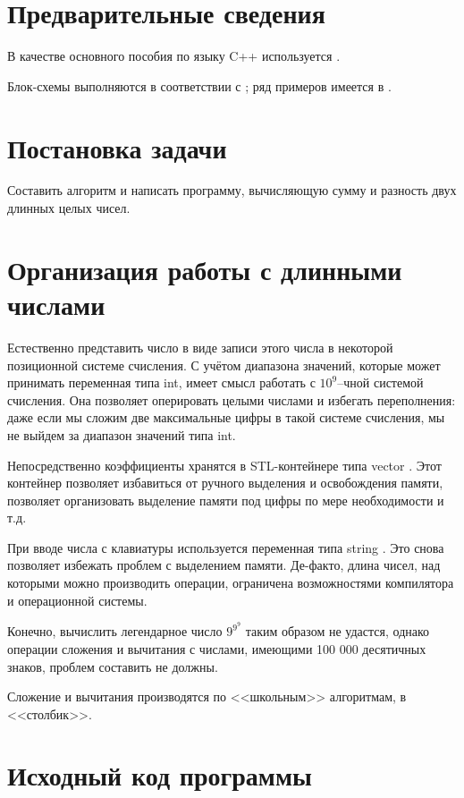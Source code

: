\documentclass[a4paper,12pt]{article} %
\begin{document}
\setcounter{page}{2}

\section*{Предварительные сведения}

В качестве основного пособия по языку C++ используется \cite{chmyhalo}.


Блок-схемы выполняются в соответствии с \cite{gost-block-scheme};
ряд примеров имеется в \cite{wiki-block-scheme}.


\section*{Постановка задачи}
Составить алгоритм и написать программу,
вычисляющую сумму и разность двух длинных целых чисел.

\section*{Организация работы с длинными числами}

Естественно представить число в виде записи этого числа в некоторой позиционной системе счисления.
С учётом диапазона значений, которые может принимать переменная типа int, имеет смысл работать с $10^9$--чной системой счисления.
Она позволяет оперировать целыми числами и избегать переполнения:
даже если мы сложим две максимальные цифры в такой системе счисления, мы не выйдем за диапазон значений типа int.

Непосредственно коэффициенты хранятся в STL-контейнере типа vector \cite{vector-cplusplus}.
Этот контейнер позволяет избавиться от ручного выделения и освобождения памяти,
позволяет организовать выделение памяти под цифры по мере необходимости и т.д.

При вводе числа с клавиатуры используется переменная типа string \cite{string-cplusplus}.
Это снова позволяет избежать проблем с выделением памяти.
Де-факто, длина чисел, над которыми можно производить операции,
ограничена возможностями компилятора и операционной системы.

Конечно, вычислить легендарное число $9^{9^9}$ \cite{zan-arifm} таким образом не удастся,
однако операции сложения и вычитания с числами, имеющими 100 000 десятичных знаков, проблем составить не должны.

Сложение и вычитания производятся по <<школьным>> алгоритмам, в <<столбик>>.

\section*{Исходный код программы}
\end{document}
